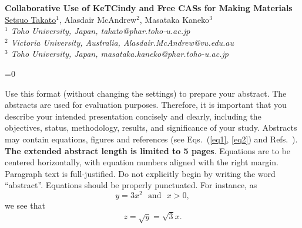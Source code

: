 \documentclass[11pt]{article}
\begin{document}
%
\vspace{-0.8cm}
\begin{flushleft}
\Large \textbf{\noindent
Collaborative Use of KeTCindy and Free CASs for Making Materials}
\\
\vspace{0.5cm}
\normalsize
\normalsize{
 \underline{Setsuo Takato}$^1$, Alasdair McAndrew$^2$,
Masataka Kaneko$^3$
} \\
\vspace{5mm}
\textit{\footnotesize
$^1$ Toho University, Japan,
takato@phar.toho-u.ac.jp\\
$^2$ Victoria University, Australia,
Alasdair.McAndrew@vu.edu.au\\
$^3$ Toho University, Japan,
masataka.kaneko@phar.toho-u.ac.jp\\
}
\end{flushleft}

=0

Use this format (without changing the settings) to prepare your abstract. The
abstracts are used for evaluation purposes. Therefore, it is important that you
describe your intended presentation concisely and clearly, including the objectives,
status, methodology, results, and significance of your study.  Abstracts may contain
equations, figures and references (see Eqs.~(\ref{eq1}, \ref{eq2}) and
Refs.~\cite{KR,WK,ABS}). {\bf The extended abstract length is limited to 5 pages}.
Equations are to be centered horizontally, with equation numbers aligned with the
right margin.  Paragraph text is full-justified.  Do not explicitly begin by writing
the word ``abstract''.  Equations should be properly punctuated.  For instance, as
\begin{equation}
y=3x^2\  \  \  \mbox{and}\  \  \  x>0, \label{eq1}
\end{equation}
we see that
\begin{equation}
z=\sqrt{y}=\sqrt{3}x. \label{eq2}
\end{equation}
\end{document}
